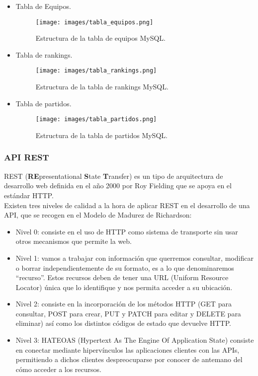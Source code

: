 \begin{itemize}
	\item Tabla de Equipos.
	\begin{figure}[H]
		\centering
		\texttt{[image: images/tabla\_equipos.png]}
		\caption{Estructura de la tabla de equipos MySQL.}
	\end{figure}
	\item Tabla de rankings.
	\begin{figure}[H]
		\centering
		\texttt{[image: images/tabla\_rankings.png]}
		\caption{Estructura de la tabla de rankings MySQL.}
	\end{figure}	
	\item Tabla de partidos.
	\begin{figure}[H]
		\centering
		\texttt{[image: images/tabla\_partidos.png]}
		\caption{Estructura de la tabla de partidos MySQL.}
	\end{figure}
\end{itemize}

\subsubsection{API REST}
REST (\textbf{RE}presentational \textbf{S}tate \textbf{T}ransfer) es un tipo de arquitectura de desarrollo web definida en el año 2000 por Roy Fielding que se apoya en el estándar HTTP. \\

Existen tres niveles de calidad a la hora de aplicar REST en el desarrollo de una API, que se recogen en el Modelo de Madurez de Richardson\cite{refapi1}\cite{refapi2}:
\begin{itemize}
	\item Nivel 0: consiste en el uso de HTTP como sistema de transporte sin usar otros mecanismos que permite la web.
	\item Nivel 1: vamos a trabajar con información que querremos consultar, modificar o borrar independientemente de su formato, es a lo que denominaremos ``recurso''. Estos recursos deben de tener una URL (Uniform Resource Locator) única que lo identifique y nos permita acceder a su ubicación.
	\item Nivel 2: consiste en la incorporación de los métodos HTTP (GET para consultar, POST para crear, PUT y PATCH para editar y DELETE para eliminar) así como los distintos códigos de estado que devuelve HTTP.
	\item Nivel 3: HATEOAS (Hypertext As The Engine Of Application State) consiste en conectar mediante hipervínculos las aplicaciones clientes con las APIs, permitiendo a dichos clientes despreocuparse por conocer de antemano del cómo acceder a los recursos.
\end{itemize}


